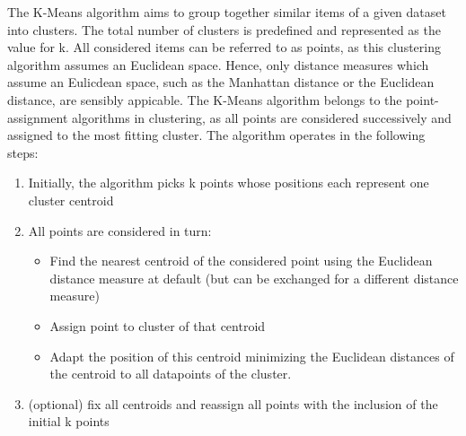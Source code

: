 The K-Means algorithm aims to group together similar items of a given dataset into clusters. 
The total number of clusters is predefined and represented as the value for k. All considered items can be referred to as points, as this clustering algorithm assumes an Euclidean space. Hence, only distance measures which assume an Eulicdean space, such as the Manhattan distance or the Euclidean distance, are sensibly appicable. The K-Means algorithm belongs to the point-assignment algorithms in clustering, as all points are considered successively and assigned to the most fitting cluster. The algorithm operates in the following steps: \cite{MMDS}
\begin{enumerate}
	\item Initially, the algorithm picks k points whose positions each represent one cluster centroid
	\item All points are considered in turn:
	\begin{itemize}
		\item Find the nearest centroid of the considered point  using the Euclidean distance measure at default (but can be exchanged for a different distance measure)
		\item Assign point to cluster of that centroid
		\item Adapt the position of this centroid minimizing the Euclidean distances of the centroid to all datapoints of the cluster.
	\end{itemize}	
	
	\item (optional) fix all centroids and reassign all points with the inclusion of the initial k points
	
\end{enumerate}

